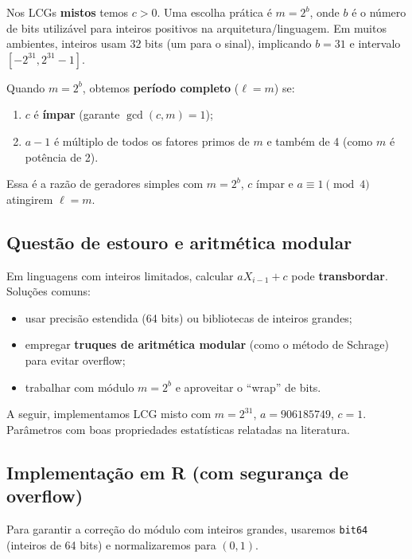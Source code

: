 \documentclass[
  letterpaper,
  DIV=11,
  numbers=noendperiod]{scrreprt}
\providecommand{\tightlist}{%
  \setlength{\itemsep}{0pt}\setlength{\parskip}{0pt}}\usepackage{longtable,booktabs,array}
\begin{document}
Nos LCGs \textbf{mistos} temos \(c>0\). Uma escolha prática é
\(m = 2^b\), onde \(b\) é o número de bits utilizável para inteiros
positivos na arquitetura/linguagem. Em muitos ambientes, inteiros usam
32 bits (um para o sinal), implicando \(b=31\) e intervalo
\([-2^{31}, 2^{31}-1]\).

Quando \(m=2^b\), obtemos \textbf{período completo} (\(\ell=m\)) se:

\begin{enumerate}
\def\labelenumi{\arabic{enumi})}
\tightlist
\item
  \(c\) é \textbf{ímpar} (garante \(\gcd(c,m)=1\));\\
\item
  \(a-1\) é múltiplo de todos os fatores primos de \(m\) e também de 4
  (como \(m\) é potência de 2).
\end{enumerate}

Essa é a razão de geradores simples com \(m=2^b\), \(c\) ímpar e
\(a \equiv 1 \pmod 4\) atingirem \(\ell=m\).

\subsection{Questão de estouro e aritmética
modular}\label{questuxe3o-de-estouro-e-aritmuxe9tica-modular}

Em linguagens com inteiros limitados, calcular \(aX_{i-1}+c\) pode
\textbf{transbordar}. Soluções comuns:

\begin{itemize}
\tightlist
\item
  usar precisão estendida (64 bits) ou bibliotecas de inteiros grandes;
\item
  empregar \textbf{truques de aritmética modular} (como o método de
  Schrage) para evitar overflow;
\item
  trabalhar com módulo \(m=2^b\) e aproveitar o ``wrap'' de bits.
\end{itemize}

A seguir, implementamos LCG misto com \(m=2^{31}\), \(a=906185749\),
\(c=1\). Parâmetros com boas propriedades estatísticas relatadas na
literatura.

\subsection{Implementação em R (com segurança de
overflow)}\label{implementauxe7uxe3o-em-r-com-seguranuxe7a-de-overflow}

Para garantir a correção do módulo com inteiros grandes, usaremos
\texttt{bit64} (inteiros de 64 bits) e normalizaremos para \((0,1)\).
\end{document}
